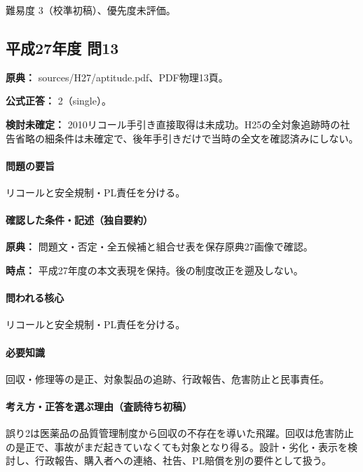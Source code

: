 \par 難易度 3（校準初稿）、優先度未評価。

\subsection{平成27年度 問13}
\label{q:h27-reg-apt-13}

\noindent\textbf{原典：} sources/H27/aptitude.pdf、PDF物理13頁。

\textbf{公式正答：} 2（single）。

\par\textbf{検討未確定：} 2010リコール手引き直接取得は未成功。H25の全対象追跡時の社告省略の細条件は未確定で、後年手引きだけで当時の全文を確認済みにしない。

\paragraph{問題の要旨} リコールと安全規制・PL責任を分ける。

\paragraph{確認した条件・記述（独自要約）}\mbox{}\par

\noindent\textbf{原典：} 問題文・否定・全五候補と組合せ表を保存原典27画像で確認。\par

\noindent\textbf{時点：} 平成27年度の本文表現を保持。後の制度改正を遡及しない。\par

\paragraph{問われる核心} リコールと安全規制・PL責任を分ける。

\paragraph{必要知識} 回収・修理等の是正、対象製品の追跡、行政報告、危害防止と民事責任。

\paragraph{考え方・正答を選ぶ理由（査読待ち初稿）} 誤り2は医薬品の品質管理制度から回収の不存在を導いた飛躍。回収は危害防止の是正で、事故がまだ起きていなくても対象となり得る。設計・劣化・表示を検討し、行政報告、購入者への連絡、社告、PL賠償を別の要件として扱う。

